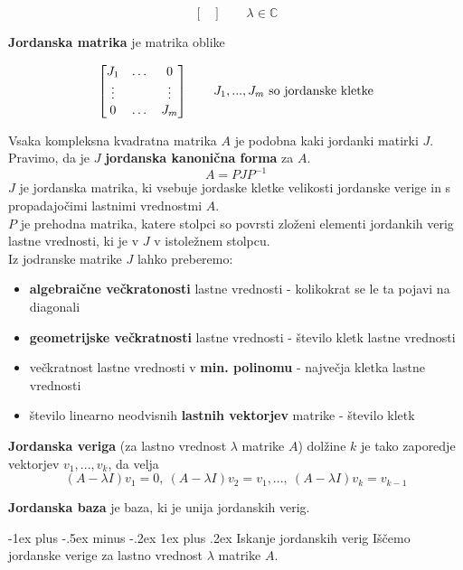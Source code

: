\documentclass[a4paper,8pt]{extarticle}
\makeatletter
\renewcommand{\subsubsection}{\@startsection{subsubsection}{3}{0mm}%
                                {-1ex plus -.5ex minus -.2ex}%
                                {1ex plus .2ex}%
                                {\normalfont\small\bfseries}}
\makeatother
\begin{document}
\begin{multicols}{3}
\[\begin{bmatrix}
    \end{bmatrix}
    \qquad
    \lambda \in \mathbb{C}
\]

\textbf{Jordanska matrika} je matrika oblike

\[
    \begin{bmatrix}
        J_1 & \dots & 0 \\
        \vdots & & \vdots \\
        0 & \dots & J_m \\
    \end{bmatrix}    
    \qquad
    J_1, ..., J_m \textmd{ so jordanske kletke}
\]

Vsaka kompleksna kvadratna matrika $A$ je podobna kaki jordanki matirki $J$. Pravimo, da je $J$ \textbf{jordanska kanonična forma} za $A$.
\[A = PJP^{-1}\]
$J$ je jordanska matrika, ki vsebuje jordaske kletke velikosti jordanske verige in s propadajočimi lastnimi vrednostmi $A$. \\
$P$ je prehodna matrika, katere stolpci so povrsti zloženi elementi jordankih verig lastne vrednosti, ki je v $J$ v istoležnem stolpcu.\\

Iz jodranske matrike $J$ lahko preberemo:
\begin{itemize}
    \item \textbf{algebraične večkratonosti} lastne vrednosti - kolikokrat se le ta pojavi na diagonali
    \item \textbf{geometrijske večkratnosti} lastne vrednosti - število kletk lastne vrednosti
    \item večkratnost lastne vrednosti v \textbf{min. polinomu} - največja kletka lastne vrednosti
    \item število linearno neodvisnih \textbf{lastnih vektorjev} matrike - število kletk
\end{itemize}

\textbf{Jordanska veriga} (za lastno vrednost $\lambda$ matrike $A$) dolžine $k$ je tako zaporedje vektorjev $v_1, ..., v_k$, da velja
\[ (A-\lambda I)v_1 = 0,\ (A-\lambda I)v_2 = v_1, ... ,\ (A-\lambda I)v_k = v_{k-1}\]

\textbf{Jordanska baza} je baza, ki je unija jordanskih verig.

\subsubsection{Iskanje jordanskih verig}
Iščemo jordanske verige za lastno vrednost $\lambda$ matrike $A$.


\end{multicols}
\end{document}

